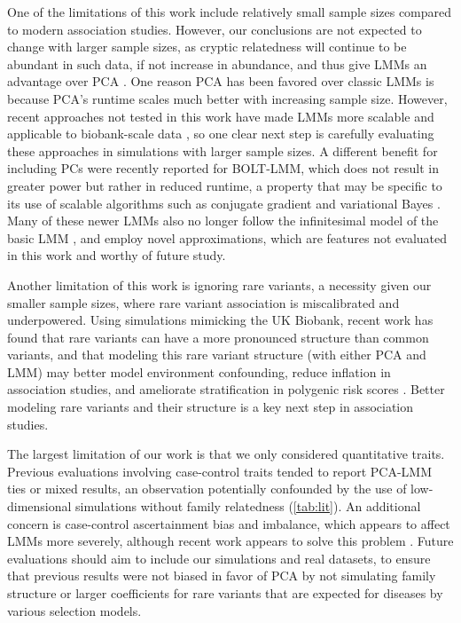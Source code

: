 \documentclass[11pt]{article}
\begin{document}
\begin{linenumbers}
One of the limitations of this work include relatively small sample sizes compared to modern association studies.
However, our conclusions are not expected to change with larger sample sizes, as cryptic relatedness will continue to be abundant in such data, if not increase in abundance, and thus give LMMs an advantage over PCA \citep{henn_cryptic_2012, shchur_number_2018, loh_mixed-model_2018}.
One reason PCA has been favored over classic LMMs is because PCA's runtime scales much better with increasing sample size.
However, recent approaches not tested in this work have made LMMs more scalable and applicable to biobank-scale data \citep{loh_efficient_2015, zhou_efficiently_2018, mbatchou_computationally_2021}, so one clear next step is carefully evaluating these approaches in simulations with larger sample sizes.
A different benefit for including PCs were recently reported for BOLT-LMM, which does not result in greater power but rather in reduced runtime, a property that may be specific to its use of scalable algorithms such as conjugate gradient and variational Bayes \citep{loh_mixed-model_2018}.
Many of these newer LMMs also no longer follow the infinitesimal model of the basic LMM \citep{loh_efficient_2015, mbatchou_computationally_2021}, and employ novel approximations, which are features not evaluated in this work and worthy of future study.

Another limitation of this work is ignoring rare variants, a necessity given our smaller sample sizes, where rare variant association is miscalibrated and underpowered.
Using simulations mimicking the UK Biobank, recent work has found that rare variants can have a more pronounced structure than common variants, and that modeling this rare variant structure (with either PCA and LMM) may better model environment confounding, reduce inflation in association studies, and ameliorate stratification in polygenic risk scores \citep{zaidi_demographic_2020}.
Better modeling rare variants and their structure is a key next step in association studies.

The largest limitation of our work is that we only considered quantitative traits.
Previous evaluations involving case-control traits tended to report PCA-LMM ties or mixed results, an observation potentially confounded by the use of low-dimensional simulations without family relatedness (\cref{tab:lit}).
An additional concern is case-control ascertainment bias and imbalance, which appears to affect LMMs more severely, although recent work appears to solve this problem \citep{yang_advantages_2014, zhou_efficiently_2018}.
Future evaluations should aim to include our simulations and real datasets, to ensure that previous results were not biased in favor of PCA by not simulating family structure or larger coefficients for rare variants that are expected for diseases by various selection models.


\end{linenumbers}
\end{document}
